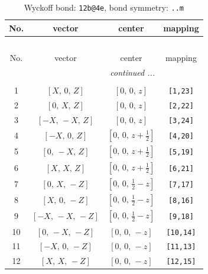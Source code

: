 \documentclass[fleqn,8pt]{jsarticle}
\begin{document}
\renewcommand{\arraystretch}{1.2}
\begin{longtable}{cccc}
\caption{Wyckoff bond: {\tt 12b@4e}, bond symmetry: {\tt ..m}}
 \\
 \hline \hline
No. & vector & center & mapping \\ \hline \endfirsthead

\multicolumn{3}{l}{\tablename\ \thetable{}} \\
 \hline \hline
No. & vector & center & mapping \\ \hline \endhead

 \hline \hline
\multicolumn{3}{r}{\footnotesize\it continued ...} \\ \endfoot

 \hline \hline
\multicolumn{3}{r}{} \\ \endlastfoot

1 & $\left[ X,\, 0,\, Z \right]$ & $\left[ 0,\, 0,\, z \right]$ & {\tt [1,23]} \\ \hline
2 & $\left[ 0,\, X,\, Z \right]$ & $\left[ 0,\, 0,\, z \right]$ & {\tt [2,22]} \\ \hline
3 & $\left[ - X,\, - X,\, Z \right]$ & $\left[ 0,\, 0,\, z \right]$ & {\tt [3,24]} \\ \hline
4 & $\left[ - X,\, 0,\, Z \right]$ & $\left[ 0,\, 0,\, z + \frac{1}{2} \right]$ & {\tt [4,20]} \\ \hline
5 & $\left[ 0,\, - X,\, Z \right]$ & $\left[ 0,\, 0,\, z + \frac{1}{2} \right]$ & {\tt [5,19]} \\ \hline
6 & $\left[ X,\, X,\, Z \right]$ & $\left[ 0,\, 0,\, z + \frac{1}{2} \right]$ & {\tt [6,21]} \\ \hline
7 & $\left[ 0,\, X,\, - Z \right]$ & $\left[ 0,\, 0,\, \frac{1}{2} - z \right]$ & {\tt [7,17]} \\ \hline
8 & $\left[ X,\, 0,\, - Z \right]$ & $\left[ 0,\, 0,\, \frac{1}{2} - z \right]$ & {\tt [8,16]} \\ \hline
9 & $\left[ - X,\, - X,\, - Z \right]$ & $\left[ 0,\, 0,\, \frac{1}{2} - z \right]$ & {\tt [9,18]} \\ \hline
10 & $\left[ 0,\, - X,\, - Z \right]$ & $\left[ 0,\, 0,\, - z \right]$ & {\tt [10,14]} \\ \hline
11 & $\left[ - X,\, 0,\, - Z \right]$ & $\left[ 0,\, 0,\, - z \right]$ & {\tt [11,13]} \\ \hline
12 & $\left[ X,\, X,\, - Z \right]$ & $\left[ 0,\, 0,\, - z \right]$ & {\tt [12,15]} \\
\end{longtable}
\end{document}
